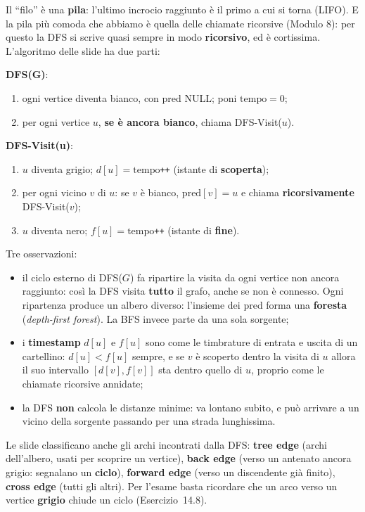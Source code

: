 Il ``filo'' è una \textbf{pila}: l'ultimo incrocio raggiunto è il primo a cui si torna
(LIFO). E la pila più comoda che abbiamo è quella delle chiamate ricorsive (Modulo 8):
per questo la DFS si scrive quasi sempre in modo \textbf{ricorsivo}, ed è cortissima.
L'algoritmo delle slide ha due parti:

\begin{passopasso}
\textbf{DFS(G)}:
\begin{enumerate}
  \item ogni vertice diventa bianco, con pred NULL; poni $\text{tempo} = 0$;
  \item per ogni vertice $u$, \textbf{se è ancora bianco}, chiama DFS-Visit($u$).
\end{enumerate}
\textbf{DFS-Visit(u)}:
\begin{enumerate}
  \item $u$ diventa grigio; $d[u] = \text{tempo}$\texttt{++} (istante di
        \textbf{scoperta});
  \item per ogni vicino $v$ di $u$: se $v$ è bianco, $\text{pred}[v] = u$ e chiama
        \textbf{ricorsivamente} DFS-Visit($v$);
  \item $u$ diventa nero; $f[u] = \text{tempo}$\texttt{++} (istante di \textbf{fine}).
\end{enumerate}
\end{passopasso}

Tre osservazioni:
\begin{itemize}
  \item il ciclo esterno di DFS($G$) fa ripartire la visita da ogni vertice non ancora
        raggiunto: così la DFS visita \textbf{tutto} il grafo, anche se non è connesso.
        Ogni ripartenza produce un albero diverso: l'insieme dei pred forma una
        \textbf{foresta} (\emph{depth-first forest}). La BFS invece parte da una sola
        sorgente;
  \item i \textbf{timestamp} $d[u]$ e $f[u]$ sono come le timbrature di entrata e uscita
        di un cartellino: $d[u] < f[u]$ sempre, e se $v$ è scoperto dentro la visita di
        $u$ allora il suo intervallo $[d[v], f[v]]$ sta dentro quello di $u$, proprio come
        le chiamate ricorsive annidate;
  \item la DFS \textbf{non} calcola le distanze minime: va lontano subito, e può
        arrivare a un vicino della sorgente passando per una strada lunghissima.
\end{itemize}

Le slide classificano anche gli archi incontrati dalla DFS: \textbf{tree edge} (archi
dell'albero, usati per scoprire un vertice), \textbf{back edge} (verso un antenato ancora
grigio: segnalano un \textbf{ciclo}), \textbf{forward edge} (verso un discendente già
finito), \textbf{cross edge} (tutti gli altri). Per l'esame basta ricordare che un arco
verso un vertice \textbf{grigio} chiude un ciclo (Esercizio~14.8).

